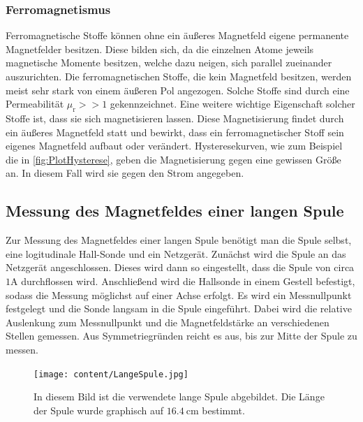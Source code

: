 \subsubsection{Ferromagnetismus}
\label{subsubsec:FERRO}
Ferromagnetische Stoffe können ohne ein äußeres Magnetfeld eigene permanente Magnetfelder besitzen. Diese bilden sich, da die einzelnen Atome jeweils magnetische Momente besitzen, welche 
dazu neigen, sich parallel zueinander auszurichten. Die ferromagnetischen Stoffe, die kein Magnetfeld besitzen, werden meist sehr stark von einem äußeren Pol angezogen. Solche Stoffe 
sind durch eine Permeabilität $\mu_{\text{r}} >> 1$ gekennzeichnet. Eine weitere wichtige Eigenschaft solcher Stoffe ist, dass sie sich magnetisieren lassen. Diese Magnetisierung findet
durch ein äußeres Magnetfeld statt und bewirkt, dass ein ferromagnetischer Stoff sein eigenes Magnetfeld aufbaut oder verändert. Hysteresekurven, wie zum Beispiel die in \autoref{fig:PlotHysterese},
geben die Magnetisierung gegen eine gewissen Größe an. In diesem Fall wird sie gegen den Strom angegeben.
\subsection{Messung des Magnetfeldes einer langen Spule}
\label{subsec:D_Lange_Spule}
Zur Messung des Magnetfeldes einer langen Spule benötigt man die Spule selbst, eine logitudinale Hall-Sonde und ein Netzgerät. Zunächst wird die Spule an das Netzgerät angeschlossen.
Dieses wird dann so eingestellt, dass die Spule von circa $1 \unit{\ampere}$ durchflossen wird. Anschließend wird die Hallsonde in einem Gestell befestigt, sodass die Messung 
möglichst auf einer Achse erfolgt.
Es wird ein Messnullpunkt festgelegt und die Sonde langsam in die Spule eingeführt. Dabei wird die relative Auslenkung zum Messnullpunkt und die Magnetfeldstärke 
an verschiedenen Stellen gemessen. Aus Symmetriegründen reicht es aus, bis zur Mitte der Spule zu messen.
\begin{figure}
    \centering
    \caption{In diesem Bild ist die verwendete lange Spule abgebildet. Die Länge der Spule wurde graphisch auf $16.4 \: \unit{\centi\metre}$ bestimmt.}
    \label{fig:Aufbau_lange_Spule}
    \texttt{[image: content/LangeSpule.jpg]}
\end{figure}
